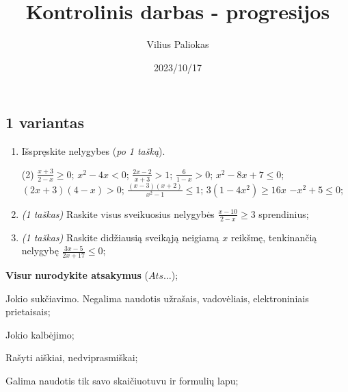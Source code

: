 \documentclass[a4paper]{article}
\title{Kontrolinis darbas - progresijos}
\author{Vilius Paliokas}
\date{2023/10/17}
\begin{document}
\thispagestyle{fancy}

\titlespacing*{\subsection}{0pt}{.75ex}{0.75ex}

\subsection*{1 variantas}

\begin{enumerate}
      \item Išspręskite nelygybes (\textit{po 1 tašką}).

            \begin{tasks}[item-format={\normalfont}, after-item-skip=2mm](2)
                  \task $\frac{x+3}{2-x} \geqslant 0$;
                  \task $x^2-4x<0$;
                  \task $\frac{2x-2}{x+3}>1$;
                  \task $\frac{6}{1-x}>0$;
                  \task $x^2-8x+7 \leqslant 0$;
                  \task $(2x+3)(4-x)>0$;
                  \task $\frac{(x-3)(x+2)}{x^2-1} \leqslant 1$;
                  \task $3(1-4x^2) \geqslant 16x$
                  \task $-x^2+5 \leq 0$;
            \end{tasks}

      \item \textit{(1 taškas)} Raskite visus sveikuosius nelygybės $\frac{x-10}{2-x}\geqslant 3$ sprendinius;
      \item \textit{(1 taškas)} Raskite didžiausią sveikąją neigiamą $x$ reikšmę, tenkinančią nelygybę $\frac{3x-5}{2x+17} \leqslant 0$;
\end{enumerate}

\begin{small}
      \begin{enumerate*}[label={(\arabic*)}]
            \item \textbf{Visur} \textbf{nurodykite atsakymus} ($Ats\ldots$);
            \item Jokio sukčiavimo. Negalima naudotis užrašais, vadovėliais,
            elektroniniais prietaisais;
            \item Jokio kalbėjimo;
            \item Rašyti aiškiai, nedviprasmiškai;
            \item Galima naudotis tik savo skaičiuotuvu ir formulių lapu;
      \end{enumerate*}
\end{small}
\end{document}
